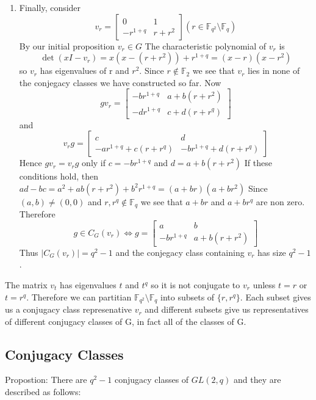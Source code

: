 \documentclass[12pt,twoside]{reedthesis}
\theoremstyle{definition}\newtheorem{definition}{Definition}
\theoremstyle{definition}\newtheorem{example}{Example}
\begin{document}
\begin{enumerate}
\item
Finally, consider
$$
v_{r} =
\begin{bmatrix}
    0 & 1 \\
    -r^{1+q} & r + r^2
\end{bmatrix}
\left(
r \in  \mathbb{F}_{q^2}\setminus \mathbb{F}_q
\right)
$$
By our initial proposition $v_r \in G$
\newline
The characteristic polynomial of 
$v_r$
is
$$
\det
(xI - v_r) =
x (x - (r + r^{2}))
+
r^{1 + q}
= (x-r)(x - r^{2})
$$
so $v_{r}$ has eigenvalues of r and $r^{2}$.
\newline
Since $r \notin  \mathbb{F}_{2}$
we see that $v_{r}$ lies in none of the conjegacy classes we have constructed so far.
Now
$$
gv_{r}= 
\begin{bmatrix}
-br^{1+q} & a+b(r+r^{2})\\
-dr^{1+q} & c+d(r+r^{q})
\end{bmatrix}
$$ 
and
$$
v_{r}g= 
\begin{bmatrix}
c  & d\\
-ar^{1+q} +c(r+r^q) & -br^{1+q} + d(r+r^{q})
\end{bmatrix}
$$
Hence
$gv_{r} = v_{r}g$ only if $c = -br^{1+q}$ and $d = a+b(r+r^{2})$
If these conditions hold, then 
$ad-bc = a^{2}+ab(r+r^{2}) + b^{2}r^{1+q} = (a+br) (a+br^{2})$
\newline
Since 
$(a,b) \ne (0,0)$ and $r, r^{q} \notin \mathbb{F}_{q}$ 
we see that $a+br$ and $a+br^{q}$ are non zero.
\newline
Therefore \[
g\in C_{G}(v_{r}) \iff g = 
\begin{bmatrix}
 a & b\\
 -br^{1+q} & a+b(r+r^2)
\end{bmatrix}
\]
\newline 
Thus $|C_G(v_r)| = q^2-1$ and the conjegacy class containing $v_r$ has size $q^2-1$.

\end{enumerate}
\newpage

The matrix $v_t$ has eigenvalues $t$ and $t^q$ so it is not conjugate to $v_r$ unless $t=r$ or $t=r^q$.  
Therefore we can partitian $\mathbb{F}_{q^2}\setminus \mathbb{F}_q$ into subsets of $\{r,r^q\}$.
Each subset gives us a conjugacy class represenative $v_r$ and different subsets give us representatives of different conjugacy classes of G, in fact all of the classes of G.

\subsection*{Conjugacy Classes}
Propostion: There are $q^2-1$ conjugacy classes of $GL(2,q) $ and they are described as follows:
\end{document}
